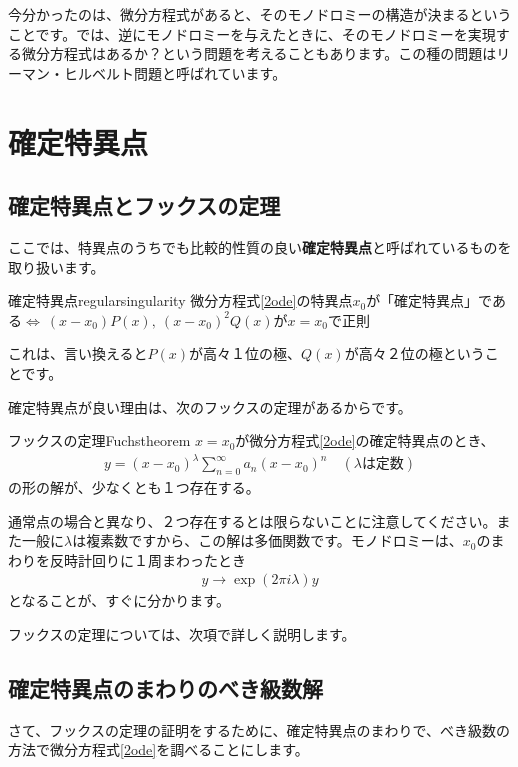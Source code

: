 \documentclass[report,paper=a4, fontsize=12pt, line_length=16cm, number_of_lines=33,dvipdfmx]{jlreq}
\numberwithin{equation}{section}
\newcommand{\strong}[1]{\textsf{\bfseries #1}}
\begin{document}
今分かったのは、微分方程式があると、そのモノドロミーの構造が決まるということです。では、逆にモノドロミーを与えたときに、そのモノドロミーを実現する微分方程式はあるか？という問題を考えることもあります。この種の問題はリーマン・ヒルベルト問題と呼ばれています。

\section{確定特異点}
\subsection{確定特異点とフックスの定理}
ここでは、特異点のうちでも比較的性質の良い\strong{確定特異点}と呼ばれているものを取り扱います。
\begin{definition}{確定特異点}{regularsingularity}
  微分方程式\eqref{2ode}の特異点$x_0$が「確定特異点」である$\Leftrightarrow\ (x-x_0)P(x),\ (x-x_0)^2Q(x)$が$x=x_0$で正則
\end{definition}
これは、言い換えると$P(x)$が高々１位の極、$Q(x)$が高々２位の極ということです。

確定特異点が良い理由は、次のフックスの定理があるからです。
\begin{theor}{フックスの定理}{Fuchstheorem}
  $x=x_0$が微分方程式\eqref{2ode}の確定特異点のとき、
  \begin{align}
    y=(x-x_0)^{\lambda}\sum_{n=0}^{\infty}a_{n}(x-x_0)^{n}\quad (\lambda \text{は定数})
  \end{align}
  の形の解が、少なくとも１つ存在する。
\end{theor}
通常点の場合と異なり、２つ存在するとは限らないことに注意してください。また一般に$\lambda$は複素数ですから、この解は多価関数です。モノドロミーは、$x_0$のまわりを反時計回りに１周まわったとき
\begin{align}
  y\to \exp(2\pi i\lambda) y
\end{align}
となることが、すぐに分かります。

フックスの定理については、次項で詳しく説明します。

\subsection{確定特異点のまわりのべき級数解}
さて、フックスの定理の証明をするために、確定特異点のまわりで、べき級数の方法で微分方程式\eqref{2ode}を調べることにします。
\end{document}

